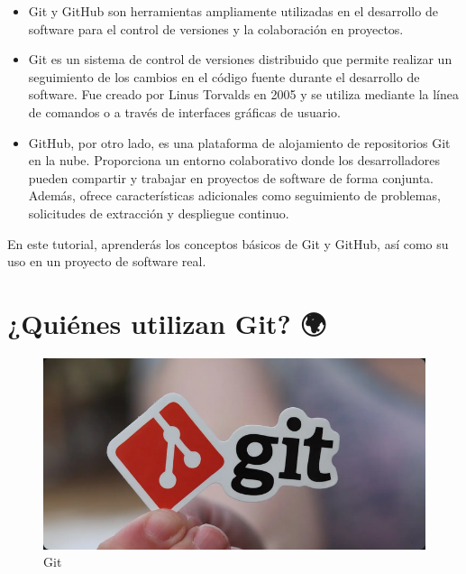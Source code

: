 \documentclass[
  a4paper,
  DIV=11,
  numbers=noendperiod,
  onepage,
  openany]{scrreprt}
\begin{document}
\begin{itemize}
\item
  Git y GitHub son herramientas ampliamente utilizadas en el desarrollo
  de software para el control de versiones y la colaboración en
  proyectos.
\item
  Git es un sistema de control de versiones distribuido que permite
  realizar un seguimiento de los cambios en el código fuente durante el
  desarrollo de software. Fue creado por Linus Torvalds en 2005 y se
  utiliza mediante la línea de comandos o a través de interfaces
  gráficas de usuario.
\item
  GitHub, por otro lado, es una plataforma de alojamiento de
  repositorios Git en la nube. Proporciona un entorno colaborativo donde
  los desarrolladores pueden compartir y trabajar en proyectos de
  software de forma conjunta. Además, ofrece características adicionales
  como seguimiento de problemas, solicitudes de extracción y despliegue
  continuo.
\end{itemize}

En este tutorial, aprenderás los conceptos básicos de Git y GitHub, así
como su uso en un proyecto de software real.

\section{¿Quiénes utilizan Git? 🌍}\label{quiuxe9nes-utilizan-git}

\begin{figure}[H]

{\centering \includegraphics[width=6.25in,height=\textheight]{unidades/unidad0/../../images/git-logo-sticker.png}

}

\caption{Git}

\end{figure}%
\end{document}
